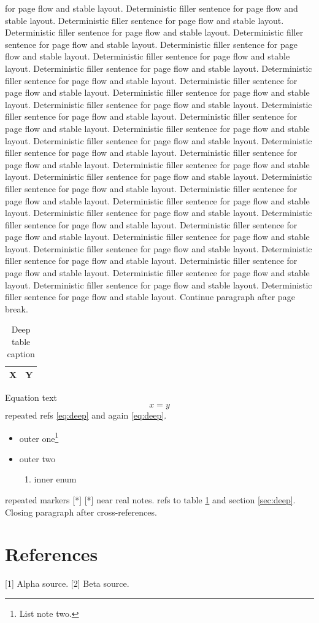 \documentclass{article}
\begin{document}
for page flow and stable layout. Deterministic filler sentence for page flow and stable layout. Deterministic filler sentence for page flow and stable layout. Deterministic filler sentence for page flow and stable layout. Deterministic filler sentence for page flow and stable layout. Deterministic filler sentence for page flow and stable layout. Deterministic filler sentence for page flow and stable layout. Deterministic filler sentence for page flow and stable layout. Deterministic filler sentence for page flow and stable layout. Deterministic filler sentence for page flow and stable layout. Deterministic filler sentence for page flow and stable layout. Deterministic filler sentence for page flow and stable layout. Deterministic filler sentence for page flow and stable layout. Deterministic filler sentence for page flow and stable layout. Deterministic filler sentence for page flow and stable layout. Deterministic filler sentence for page flow and stable layout. Deterministic filler sentence for page flow and stable layout. Deterministic filler sentence for page flow and stable layout. Deterministic filler sentence for page flow and stable layout. Deterministic filler sentence for page flow and stable layout. Deterministic filler sentence for page flow and stable layout. Deterministic filler sentence for page flow and stable layout. Deterministic filler sentence for page flow and stable layout. Deterministic filler sentence for page flow and stable layout. Deterministic filler sentence for page flow and stable layout. Deterministic filler sentence for page flow and stable layout. Deterministic filler sentence for page flow and stable layout. Deterministic filler sentence for page flow and stable layout. Deterministic filler sentence for page flow and stable layout. Deterministic filler sentence for page flow and stable layout. Deterministic filler sentence for page flow and stable layout. Deterministic filler sentence for page flow and stable layout. Deterministic filler sentence for page flow and stable layout. \newpage Continue paragraph after page break.\begin{table}[h]\centering\caption{Deep table caption}\label{tab:deep}\begin{tabular}{|l|l|}\hline X&Y\\\hline\end{tabular}\end{table} Equation text \begin{equation}x=y\label{eq:deep}\end{equation} repeated refs \ref{eq:deep} and again \ref{eq:deep}.\begin{itemize}\item outer one\footnote{List note two.}\item outer two\begin{enumerate}\item inner enum\end{enumerate}\end{itemize} repeated markers [*] [*] near real notes. refs to table \ref{tab:deep} and section \ref{sec:deep}. Closing paragraph after cross-references.\section{References} [1] Alpha source. [2] Beta source.
\end{document}
